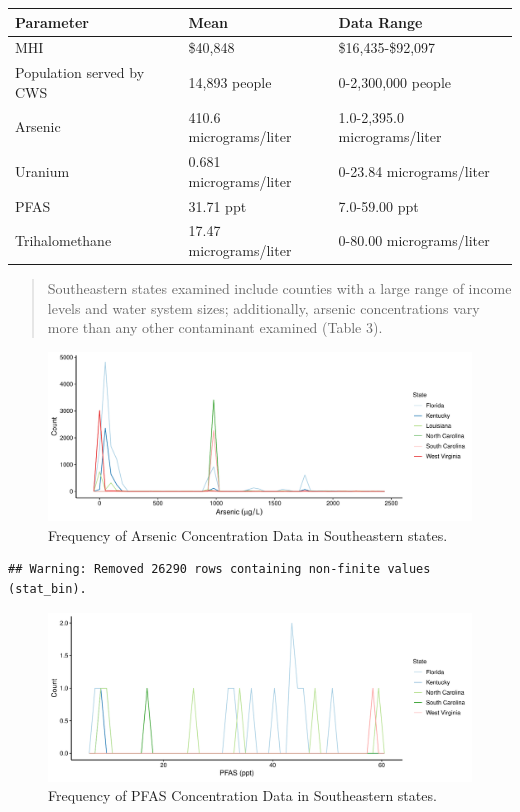 \documentclass[12pt,]{article}
\begin{document}
\begin{longtable}[]{@{}lll@{}}
\toprule
\textbf{Parameter} & \textbf{Mean} & \textbf{Data Range}\tabularnewline
\midrule
\endhead
MHI & \$40,848 & \$16,435-\$92,097\tabularnewline
Population served by CWS & 14,893 people & 0-2,300,000
people\tabularnewline
Arsenic & 410.6 micrograms/liter & 1.0-2,395.0
micrograms/liter\tabularnewline
Uranium & 0.681 micrograms/liter & 0-23.84
micrograms/liter\tabularnewline
PFAS & 31.71 ppt & 7.0-59.00 ppt\tabularnewline
Trihalomethane & 17.47 micrograms/liter & 0-80.00
micrograms/liter\tabularnewline
\bottomrule
\end{longtable}

\begin{quote}
Southeastern states examined include counties with a large range of
income levels and water system sizes; additionally, arsenic
concentrations vary more than any other contaminant examined (Table 3).
\end{quote}

\begin{figure}
\centering
\includegraphics{Project_Template_files/figure-latex/figs-1.pdf}
\caption{Frequency of Arsenic Concentration Data in Southeastern
states.}
\end{figure}

\begin{verbatim}
## Warning: Removed 26290 rows containing non-finite values (stat_bin).
\end{verbatim}

\begin{figure}
\centering
\includegraphics{Project_Template_files/figure-latex/figs2-1.pdf}
\caption{Frequency of PFAS Concentration Data in Southeastern states.}
\end{figure}
\end{document}
